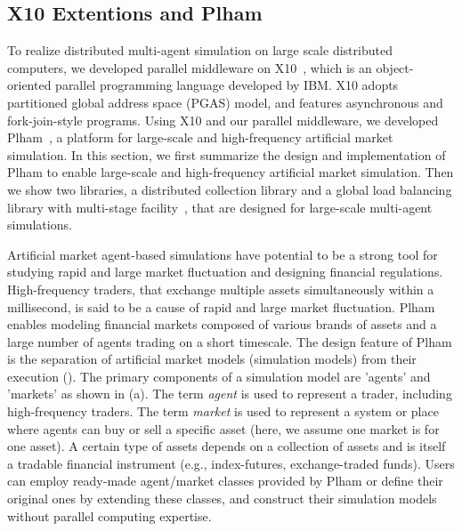 \subsection{X10 Extentions and Plham}
\label{ss:X10 Extentions and Plham}

To realize distributed multi-agent simulation on large scale distributed computers,
we developed parallel middleware on X10~\cite{x10},
which is an object-oriented parallel programming language developed by IBM.
X10 adopts partitioned global address space (PGAS) model,
and features asynchronous and fork-join-style programs.
Using X10 and our parallel middleware, we developed Plham~\cite{toriiPlham,arob17plham}, 
a platform for large-scale and high-frequency artificial
market simulation.
In this section, we first summarize the design and implementation of Plham to enable 
large-scale and high-frequency artificial market simulation.
Then we show two libraries, 
a distributed collection library and
a global load balancing library with multi-stage facility~\cite{glb2m}, 
that are designed for large-scale multi-agent simulations.

Artificial market agent-based simulations have potential to be a strong tool for studying rapid and large market fluctuation and designing financial regulations.
High-frequency traders, that exchange multiple assets simultaneously within a millisecond,
is said to be a cause of rapid and large market fluctuation.
Plham enables modeling financial markets
composed of various brands of assets and a large number of agents trading on a short timescale.
The design feature of Plham is the separation
of artificial market models (simulation models) from their execution ().
The primary components of a simulation model are 'agents' and 'markets' as shown in (a).
The term \textit{agent} is used to represent a trader, including high-frequency traders.
The term \textit{market} is used to represent a system or place where agents can buy or sell a specific asset (here, we assume one market is for one asset).
A certain type of assets depends on a collection of assets and is itself a tradable financial instrument (e.g., index-futures, exchange-traded funds). 
Users can employ ready-made agent/market classes provided by Plham or define
their original ones by extending these classes,
and construct their simulation models without parallel computing expertise.

